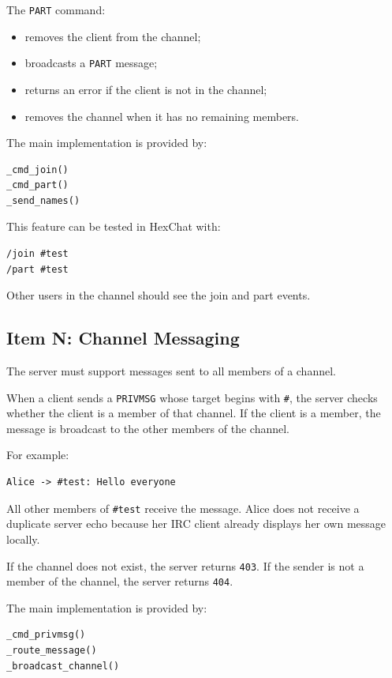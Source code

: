 \documentclass[a4paper,12pt]{article}
\begin{document}
The \texttt{PART} command:

\begin{itemize}
    \item removes the client from the channel;
    \item broadcasts a \texttt{PART} message;
    \item returns an error if the client is not in the channel;
    \item removes the channel when it has no remaining members.
\end{itemize}

The main implementation is provided by:

\begin{lstlisting}[language=Python]
_cmd_join()
_cmd_part()
_send_names()
\end{lstlisting}

This feature can be tested in HexChat with:

\begin{lstlisting}
/join #test
/part #test
\end{lstlisting}

Other users in the channel should see the join and part events.

\subsection{Item N: Channel Messaging}

The server must support messages sent to all members of a channel.

When a client sends a \texttt{PRIVMSG} whose target begins with \texttt{\#}, the server checks whether the client is a member of that channel. If the client is a member, the message is broadcast to the other members of the channel.

For example:

\begin{verbatim}
Alice -> #test: Hello everyone
\end{verbatim}

All other members of \texttt{\#test} receive the message. Alice does not receive a duplicate server echo because her IRC client already displays her own message locally.

If the channel does not exist, the server returns \texttt{403}. If the sender is not a member of the channel, the server returns \texttt{404}.

The main implementation is provided by:

\begin{lstlisting}[language=Python]
_cmd_privmsg()
_route_message()
_broadcast_channel()
\end{lstlisting}
\end{document}
